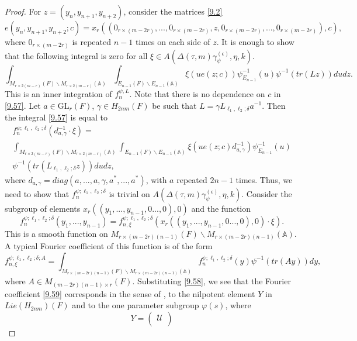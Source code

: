 \documentclass[12pts]{amsart}
\newcommand{\BA}{{\mathbb {A}}}
\newcommand{\GL}{{\mathrm{GL}}}
\begin{document}
\begin{proof}
For $z=(y_n,y_{n+1},y_{n+2})$, consider the matrices \eqref{9.2}
$$
e(y_n,y_{n+1},y_{n+2};c)=x_r((0_{r\times (m-2r)},...,0_{r\times (m-2r)},z,0_{r\times (m-2r)},...,0_{r\times (m-2r)}),c),
$$
where $0_{r\times (m-2r)}$ is repeated $n-1$ times on each side of $z$.	
It is enough to show that the following integral is zero for all $\xi\in A(\Delta(\tau,m)\gamma_\psi^{(\epsilon)},\eta,k)$.
\begin{equation}\label{9.57}
\int_{M_{r\times 2(m-r)}(F)\backslash M_{r\times 2(m-r)}(\BA)}\int_{E_{n-1}(F)\backslash E_{n-1}(\BA)}\xi(ue(z;c))\psi^{-1}_{E_{n-1}}(u)\psi^{-1}(tr(Lz))dudz.
\end{equation}	
This is an inner integration of $f_n^{\psi,L}$. Note that there is no dependence on $c$ in \eqref{9.57}. Let $a\in \GL_r(F)$, $\gamma\in H_{2nm}(F)$ be such that $L=\gamma L_{\ell_1,\ell_2;\delta}a^{-1}$.	Then the integral \eqref{9.57} is equal to 
\begin{multline}\label{9.58}
f_n^{\psi;\ell_1,\ell_2;\delta}(d_{a,\gamma}^{-1}\cdot\xi)=\\
\int_{M_{r\times 2(m-r)}(F)\backslash M_{r\times 2(m-r)}(\BA)}\int_{E_{n-1}(F)\backslash E_{n-1}(\BA)}\xi(ue(z;c)d^{-1}_{a,\gamma})\psi^{-1}_{E_{n-1}}(u)\\
\psi^{-1}(tr(L_{\ell_1,\ell_2;\delta}z))dudz,
\end{multline}	
where $d_{a,\gamma}=diag(a,...,a,\gamma,a^*,...,a^*)$, with $a$ repeated $2n-1$ times. Thus, we need to show that $f_n^{\psi;\ell_1,\ell_2;\delta}$ is trivial on $A(\Delta(\tau,m)\gamma_\psi^{(\epsilon)},\eta,k)$. Consider the subgroup of elements $x_r((y_1,...,y_{n-1},0...,0),0)$ and the function 
$$
f_n^{\psi;\ell_1,\ell_2;\delta}(y_1,...,y_{n-1})=
f_{n,\xi}^{\psi;\ell_1,\ell_2;\delta}(x_r((y_1,...,y_{n-1},0...,0),0)\cdot\xi).
$$
This is a smooth function on $M_{r\times (m-2r)(n-1)}(F)\backslash M_{r\times (m-2r)(n-1)}(\BA)$. A typical Fourier coefficient of this function is of the form
\begin{equation}\label{9.59}
f_{n,\xi}^{\psi;\ell_1,\ell_2;\delta;A}=\int_{M_{r\times (m-2r)(n-1)}(F)\backslash M_{r\times (m-2r)(n-1)}(\BA)}f_n^{\psi;\ell_1,\ell_2;\delta}(y)\psi^{-1}(tr(Ay))dy,
\end{equation}
where $A\in M_{(m-2r)(n-1)\times r}(F)$. Substituting \eqref{9.58}, we see that the Fourier coefficient \eqref{9.59} corresponds 
in the sense of \cite{MW87}, to the nilpotent element $Y$ in $Lie(H_{2nm})(F)$
and to the one parameter subgroup $\varphi(s)$, where
$$
Y=\begin{pmatrix}\mathcal{U}\\

\end{pmatrix}$$
\end{proof}
\end{document}

